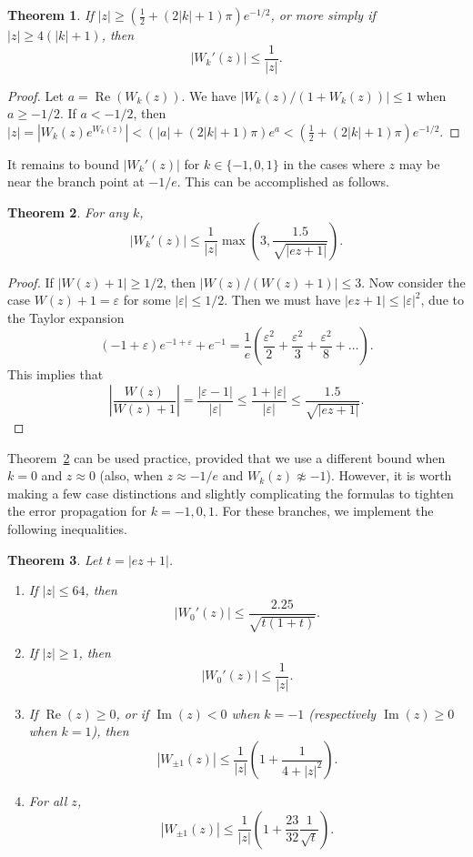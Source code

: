 \documentclass[11pt,a4paper]{article}
\newtheorem{theorem}{Theorem}
\begin{document}
\begin{theorem}If $|z| \ge \left(\tfrac{1}{2} + (2|k|+1)\pi\right) e^{-1/2}$,
or more simply if $|z| \ge 4(|k|+1)$, then
$$|W_k'(z)| \le \frac{1}{|z|}.$$
\end{theorem}
\begin{proof}
Let $a = \operatorname{Re}(W_k(z))$.
We have $|W_k(z)/(1+W_k(z))| \le 1$ when $a \ge -1/2$.
If $a < -1/2$,
then $|z| = |W_k(z) e^{W_k(z)}| < (|a| + (2|k|+1)\pi) e^a < (\tfrac{1}{2} + (2|k|+1)\pi) e^{-1/2}$.
\end{proof}

It remains to bound $|W_k'(z)|$ for $k \in \{-1,0,1\}$ in the cases
where $z$ may be near the branch point at $-1/e$.
This can be accomplished as follows.

\begin{theorem}
\label{thm:genericderivbound}
For any $k$,
$$|W_k'(z)| \le \frac{1}{|z|} \max\left(3, \frac{1.5}{\sqrt{|e z + 1|}}\right).$$
\end{theorem}

\begin{proof}
If $|W(z) + 1| \ge 1/2$, then $|W(z)/(W(z)+1)| \le 3$.
Now consider the case $W(z) + 1 = \varepsilon$ for some $|\varepsilon| \le 1/2$.
Then we must have $|e z + 1| \le |\varepsilon|^2$, due to the Taylor expansion
$$(-1+\varepsilon) e^{-1+\varepsilon} + e^{-1} = \frac{1}{e}
\left(\frac{\varepsilon^2}{2} + \frac{\varepsilon^2}{3} + \frac{\varepsilon^2}{8} + \ldots\right).$$
This implies that
$$\left| \frac{W(z)}{W(z) + 1}\right| = \frac{|\varepsilon - 1|}{|\varepsilon|}
\le \frac{1+|\varepsilon|}{|\varepsilon|} \le \frac{1.5}{\sqrt{|ez+1|}}.$$
\end{proof}

Theorem~\ref{thm:genericderivbound} can be used practice,
provided that we use a different bound when $k = 0$ and $z \approx 0$
(also, when $z \approx -1/e$ and $W_k(z) \not \approx -1$).
However, it is worth making a few
case distinctions and slightly complicating the formulas
to tighten the error propagation for $k = -1,0,1$.
For these branches, we implement the following inequalities.

\begin{theorem}
Let $t = |ez+1|$.
\begin{enumerate}
\item If $|z| \le 64$, then
$$|W_0'(z)| \le \frac{2.25}{\sqrt{t (1+t)}}.$$
\item If $|z| \ge 1$, then
$$|W_0'(z)| \le \frac{1}{|z|}.$$
\item If $\operatorname{Re}(z) \ge 0$, or if $\operatorname{Im}(z) < 0$ when $k = -1$
(respectively $\operatorname{Im}(z) \ge 0$ when $k = 1$), then
$$|W_{\pm 1}(z)| \le \frac{1}{|z|} \left(1 + \frac{1}{4+|z|^2}\right).$$
\item For all $z$,
$$|W_{\pm 1}(z)| \le \frac{1}{|z|} \left(1 + \frac{23}{32} \frac{1}{\sqrt{t}}\right).$$
\end{enumerate}
\end{theorem}
\end{document}
